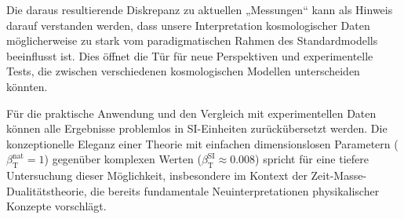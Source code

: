 \documentclass[12pt,a4paper]{article}
\newcommand{\betaT}{\beta_{\text{T}}}
\begin{document}
	Die daraus resultierende Diskrepanz zu aktuellen „Messungen“ kann als Hinweis darauf verstanden werden, dass unsere Interpretation kosmologischer Daten möglicherweise zu stark vom paradigmatischen Rahmen des Standardmodells beeinflusst ist. Dies öffnet die Tür für neue Perspektiven und experimentelle Tests, die zwischen verschiedenen kosmologischen Modellen unterscheiden könnten.
	
	Für die praktische Anwendung und den Vergleich mit experimentellen Daten können alle Ergebnisse problemlos in SI-Einheiten zurückübersetzt werden. Die konzeptionelle Eleganz einer Theorie mit einfachen dimensionslosen Parametern (\(\betaT^{\text{nat}} = 1\)) gegenüber komplexen Werten (\(\betaT^{\text{SI}} \approx 0.008\)) spricht für eine tiefere Untersuchung dieser Möglichkeit, insbesondere im Kontext der Zeit-Masse-Dualitätstheorie, die bereits fundamentale Neuinterpretationen physikalischer Konzepte vorschlägt.
	
\end{document}
